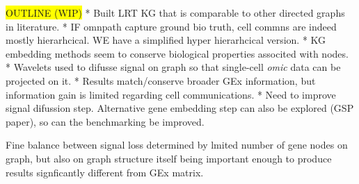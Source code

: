 \colorbox{yellow}{OUTLINE (WIP)}
* Built LRT KG that is comparable to other directed graphs in literature.
    * IF omnpath capture ground bio truth, cell commns are indeed mostly hierarhcical. WE have a simplified hyper hierarhcical version.
* KG embedding methods seem to conserve biological properties associted with nodes.
* Wavelets used to difusse signal on graph so that single-cell \emph{omic} data can be projected on it.
* Results match/conserve broader GEx information, but information gain is limited regarding cell communications.
* Need to improve signal difussion step. Alternative gene embedding step can also be explored (GSP paper), so can the benchmarking be improved.

Fine balance between signal loss determined by lmited number of gene nodes on graph, but also on graph structure itself being important enough to produce results signficantly different from GEx matrix.